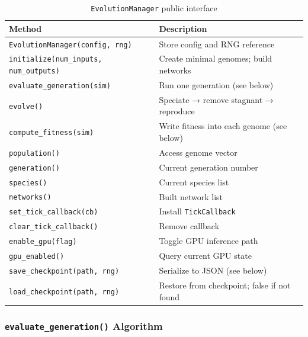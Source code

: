\begin{table}[H]
\centering\small
\caption{\texttt{EvolutionManager} public interface}
\begin{tabularx}{\textwidth}{@{}lX@{}}
\toprule
\textbf{Method} & \textbf{Description} \\
\midrule
\texttt{EvolutionManager(config, rng)} & Store config and RNG reference \\
\texttt{initialize(num\_inputs, num\_outputs)} & Create minimal genomes; build networks \\
\texttt{evaluate\_generation(sim)} & Run one generation (see below) \\
\texttt{evolve()} & Speciate → remove stagnant → reproduce \\
\texttt{compute\_fitness(sim)} & Write fitness into each genome (see below) \\
\texttt{population()} & Access genome vector \\
\texttt{generation()} & Current generation number \\
\texttt{species()} & Current species list \\
\texttt{networks()} & Built network list \\
\texttt{set\_tick\_callback(cb)} & Install \texttt{TickCallback} \\
\texttt{clear\_tick\_callback()} & Remove callback \\
\texttt{enable\_gpu(flag)} & Toggle GPU inference path \\
\texttt{gpu\_enabled()} & Query current GPU state \\
\texttt{save\_checkpoint(path, rng)} & Serialize to JSON (see below) \\
\texttt{load\_checkpoint(path, rng)} & Restore from checkpoint; false if not found \\
\bottomrule
\end{tabularx}
\end{table}

\subsubsection{\texttt{evaluate\_generation()} Algorithm}

